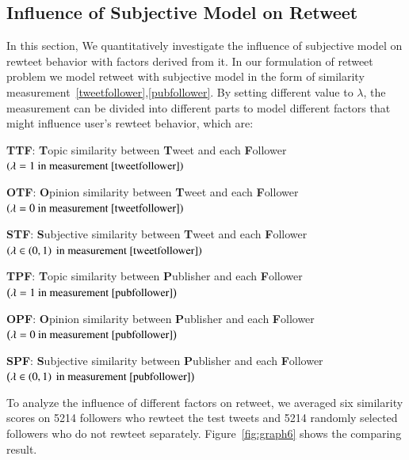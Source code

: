 \documentclass[preprint,times]{elsarticle}
\begin{document}
\subsection{Influence of Subjective  Model on Retweet}
\label{influence}
In this section, We quantitatively investigate the influence of subjective model on rewteet behavior with factors derived from it. 
In our formulation of retweet problem we model retweet with subjective model in the form of similarity measurement~\ref{tweetfollower},\ref{pubfollower}.
By setting different value to $ \lambda $, the measurement can be divided into different parts to model different factors that might influence user's rewteet behavior, which are:
\begin{itemize*}
\item \textbf{TTF}: \textbf{T}opic similarity between \textbf{T}weet and each \textbf{F}ollower $ \left( \lambda =1  \text{ in measurement~\ref{tweetfollower}} \right) $ 
\item \textbf{OTF}: \textbf{O}pinion similarity between \textbf{T}weet and each \textbf{F}ollower $ \left( \lambda =0 \text{ in measurement~\ref{tweetfollower}} \right) $
\item \textbf{STF}: \textbf{S}ubjective similarity between \textbf{T}weet and each \textbf{F}ollower $ \left( \lambda \in \left( 0,1 \right)   \text{ in measurement~\ref{tweetfollower}} \right) $ 
\item \textbf{TPF}: \textbf{T}opic similarity between \textbf{P}ublisher and each \textbf{F}ollower $ \left( \lambda =1  \text{ in measurement~\ref{pubfollower}}  \right) $ 
\item \textbf{OPF}: \textbf{O}pinion similarity between \textbf{P}ublisher and each \textbf{F}ollower $ \left( \lambda =0 \text{ in measurement~\ref{pubfollower}} \right) $
\item \textbf{SPF}: \textbf{S}ubjective similarity between \textbf{P}ublisher and each \textbf{F}ollower $ \left( \lambda \in \left( 0,1 \right)   \text{ in measurement~\ref{pubfollower}} \right) $
\end{itemize*}
To analyze the influence of different factors on retweet, we averaged six similarity scores on 5214 followers who rewteet the test tweets and 5214 randomly selected followers who do not rewteet separately. 
Figure~\ref{fig:graph6} shows the comparing result.
\end{document}

